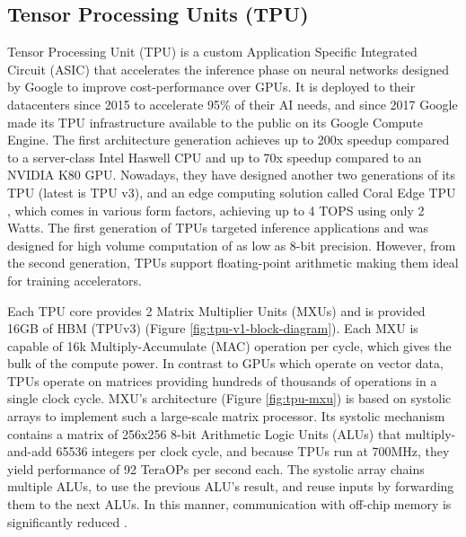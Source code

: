 \subsection{Tensor Processing Units (TPU)}
Tensor Processing Unit (TPU) \cite{In-Datacenter-Performance-Analysis-of-a-Tensor-Processing-Unit} is a custom Application Specific Integrated Circuit (ASIC) that accelerates the inference phase on neural networks designed by Google to improve cost-performance over GPUs. It is deployed to their datacenters since 2015 to accelerate 95\% of their AI needs, and since 2017 Google made its TPU infrastructure available to the public on its Google Compute Engine. The first architecture generation achieves up to 200x speedup compared to a server-class Intel Haswell CPU and up to 70x speedup compared to an NVIDIA K80 GPU. Nowadays, they have designed another two generations of its TPU (latest is TPU v3), and an edge computing solution called Coral Edge TPU \cite{Coral-Edge-TPU}, which comes in various form factors, achieving up to 4 TOPS using only 2 Watts. The first generation of TPUs targeted inference applications and was designed for high volume computation of as low as 8-bit precision. However, from the second generation, TPUs support floating-point arithmetic making them ideal for training accelerators.

Each TPU core provides 2 Matrix Multiplier Units (MXUs) and is provided 16GB of HBM (TPUv3) (Figure \ref{fig:tpu-v1-block-diagram}). Each MXU is capable of 16k Multiply-Accumulate (MAC) operation per cycle, which gives the bulk of the compute power. In contrast to GPUs which operate on vector data, TPUs operate on matrices providing hundreds of thousands of operations in a single clock cycle. MXU's architecture (Figure \ref{fig:tpu-mxu}) is based on systolic arrays to implement such a large-scale matrix processor. Its systolic mechanism contains a matrix of 256x256 8-bit Arithmetic Logic Units (ALUs) that multiply-and-add 65536 integers per clock cycle, and because TPUs run at 700MHz, they yield performance of 92 TeraOPs per second each. The systolic array chains multiple ALUs, to use the previous ALU's result, and reuse inputs by forwarding them to the next ALUs. In this manner, communication with off-chip memory is significantly reduced \cite{An-in-depth-look-at-Google-first-TPU}.

